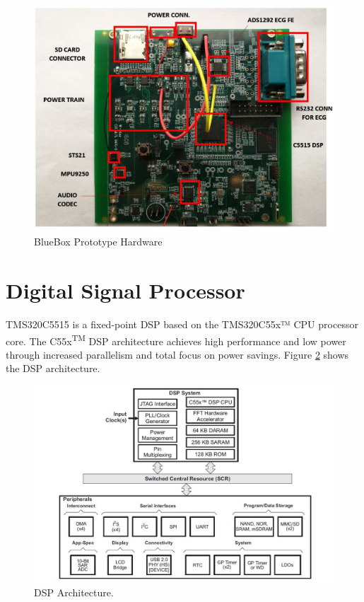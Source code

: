 \begin{figure}[h]
	\centering
	\includegraphics[scale = 0.5]{BlueBox_Hardware.jpg}
	\caption{BlueBox Prototype Hardware \label{BlueBox_Hardware}}
\end{figure} 
\section{Digital Signal Processor}
TMS320C5515 is a fixed-point DSP based on the TMS320C55x™ CPU processor core. The C55x\textsuperscript{TM} DSP architecture achieves high performance and low power through increased parallelism and total focus on power savings. Figure \ref{C5515 Architecture} shows the DSP architecture.

\begin{figure}[h]
	\centering
	\includegraphics[scale = 0.75 ]{C5515_arch.JPG}
	\caption{DSP Architecture. \cite{tms320c5515}\label{C5515 Architecture}}
\end{figure} 
